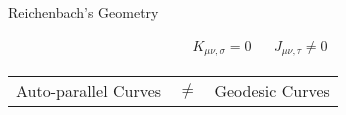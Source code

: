 \documentclass[final]{article}
\begin{document}
\begin{infobox}

\begin{center}
Reichenbach's Geometry	
\end{center}

\begin{align*}
K_{\mu \nu, \sigma} = 0 & & J_{\mu\nu,\tau}\neq 0
\end{align*}


\begin{center}
\begin{tabular}{ccc}
 Auto-parallel Curves & $\neq$ & Geodesic Curves
\end{tabular}
\end{center}
	
\end{infobox}



\printshorthands
\printbibliography
\end{document}
